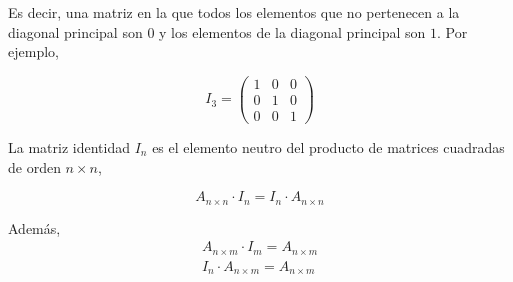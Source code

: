 \begin{paracol}{2}
Es decir, una matriz en la que todos los elementos que no pertenecen a la diagonal principal son $0$ y los elementos de la diagonal principal son $1$. Por ejemplo,
    
\end{paracol}

\begin{equation*}
I_3=\begin{pmatrix}
1& 0& 0\\
0& 1& 0\\
0& 0& 1
\end{pmatrix}
\end{equation*}

\begin{paracol}{2}
La matriz identidad $I_n$ es el elemento neutro del producto de matrices cuadradas de orden $n\times n$,    
\end{paracol}

\begin{equation*}
A_{n\times n}\cdot I_n=I_n\cdot A_{n\times n}
\end{equation*}

Además,
\begin{gather*}
A_{n\times m}\cdot I_m=A_{n \times m}\\
I_n\cdot A_{n\times m}=A_{n\times m}
\end{gather*}

